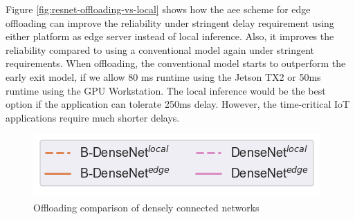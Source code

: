 Figure \ref{fig:resnet-offloading-vs-local} shows how the \gls{aee} scheme for edge offloading can improve the reliability under stringent delay requirement using either platform as edge server instead of local inference. Also, it improves the reliability compared to using a conventional model again under stringent requirements. When offloading, the conventional model starts to outperform the early exit model, if we allow 80 ms runtime using the Jetson TX2 or 50ms runtime using the GPU Workstation. The local inference would be the best option if the application can tolerate 250ms delay. However, the time-critical IoT applications require much shorter delays. 
\begin{figure}
	\captionsetup[subfigure]{justification=centering, farskip=0pt,captionskip=0pt}
	\centering
	\includegraphics[width=.3\linewidth]{figures/edge/gpu_b-densenet_offloading_vs_local_legend}
	\hfill
	\hfill
	\caption[Offloading comparison of densely connected networks]{Offloading comparison of densely connected networks}
	\label{fig:densenet-offloading-vs-local}
\end{figure}

